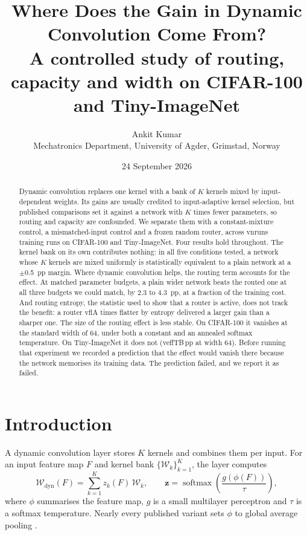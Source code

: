 \documentclass[10pt,a4paper]{article}
\title{\vspace{-1.3cm}\textbf{Where Does the Gain in Dynamic Convolution Come From?}\\[3pt]
\large A controlled study of routing, capacity and width on CIFAR-100 and Tiny-ImageNet}
\author{Ankit Kumar\\\small Mechatronics Department, University of Agder, Grimstad, Norway}
\date{\small 24 September 2026}
\newcommand{\zv}{\mathbf{z}}
\newcommand{\V}[1]{\csname v#1\endcsname}
\begin{document}
\maketitle
\vspace{-0.6cm}

\begin{abstract}
\noindent
Dynamic convolution replaces one kernel with a bank of $K$ kernels mixed
by input-dependent weights. Its gains are usually credited to
input-adaptive kernel selection, but published comparisons set it
against a network with $K$ times fewer parameters, so routing and
capacity are confounded. We separate them with a constant-mixture
control, a mismatched-input control and a frozen random router, across
\V{nruns} training runs on CIFAR-100 and Tiny-ImageNet. Four results hold
throughout. The kernel bank on its own contributes nothing: in all five
conditions tested, a network whose $K$ kernels are mixed uniformly is
statistically equivalent to a plain network at a $\pm$\SI{0.5}{pp}
margin. Where dynamic convolution helps, the routing term accounts for
the effect. At matched parameter budgets, a plain wider network beats the
routed one at all three budgets we could match, by 2.3 to
\SI{4.3}{pp}, at a fraction of the training cost. And routing entropy,
the statistic used to show that a router is active, does not track the
benefit: a router \V{flA} times flatter by entropy delivered a larger gain
than a sharper one. The size of the routing effect is less stable. On
CIFAR-100 it vanishes at the standard width of 64, under both a constant
and an annealed softmax temperature. On Tiny-ImageNet it does not
(\V{effTB}\,pp at width 64). Before running that experiment we recorded
a prediction that the effect would vanish there because the network
memorises its training data. The prediction failed, and we report it as
failed.
\end{abstract}

\section{Introduction}

A dynamic convolution layer stores $K$ kernels and combines them per
input. For an input feature map $F$ and kernel bank
$\{\mathcal{W}_k\}_{k=1}^{K}$, the layer computes
\begin{equation}
\mathcal{W}_{\text{dyn}}(F)=\sum_{k=1}^{K} z_k(F)\,\mathcal{W}_k,
\qquad
\zv=\operatorname{softmax}\!\left(\frac{g(\phi(F))}{\tau}\right),
\label{eq:dynconv}
\end{equation}
where $\phi$ summarises the feature map, $g$ is a small multilayer
perceptron and $\tau$ is a softmax temperature. Nearly every published
variant sets $\phi$ to global average pooling
\citep{yang2019condconv,chen2020dynamic}.
\end{document}
